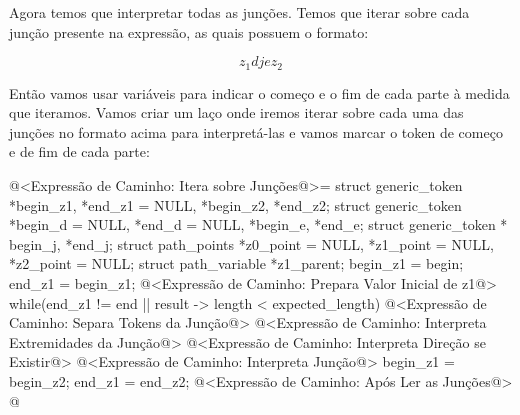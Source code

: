 Agora temos que interpretar todas as junções. Temos que iterar sobre
cada junção presente na expressão, as quais possuem o formato:

$$
z_1{d} j {e}z_2
$$

Então vamos usar variáveis para indicar o começo e o fim de cada parte
à medida que iteramos. Vamos criar um laço onde iremos iterar sobre
cada uma das junções no formato acima para interpretá-las e vamos
marcar o token de começo e de fim de cada parte:

\iniciocodigo
@<Expressão de Caminho: Itera sobre Junções@>=
{
  struct generic_token *begin_z1, *end_z1 = NULL, *begin_z2, *end_z2;
  struct generic_token *begin_d = NULL, *end_d = NULL, *begin_e, *end_e;
  struct generic_token * begin_j, *end_j;
  struct path_points *z0_point = NULL, *z1_point = NULL, *z2_point = NULL;
  struct path_variable *z1_parent;
  begin_z1 = begin;
  end_z1 = begin_z1;
  @<Expressão de Caminho: Prepara Valor Inicial de z1@>
  while(end_z1 != end || result -> length < expected_length){
    @<Expressão de Caminho: Separa Tokens da Junção@>
    @<Expressão de Caminho: Interpreta Extremidades da Junção@>
    @<Expressão de Caminho: Interpreta Direção se Existir@>
    @<Expressão de Caminho: Interpreta Junção@>
    begin_z1 = begin_z2;
    end_z1 = end_z2;
  }
  @<Expressão de Caminho: Após Ler as Junções@>
}
@
\fimcodigo

